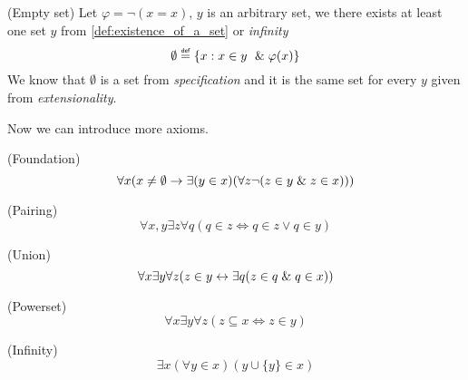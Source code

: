 \begin{definition}{(Empty set)}\label{def:emptyset}
Let $\varphi = \neg(x = x)$, $y$ is an arbitrary set, we there exists at least one set $y$ from \ref{def:existence_of_a_set} or \emph{infinity}
\begin{equation}
\emptyset \defeq \{x : x \in y\ \et \varphi(x)\}
\end{equation}
We know that $\emptyset$ is a set from \emph{specification} and it is the same set for every $y$ given from \emph{extensionality}.
\end{definition}

Now we can introduce more axioms.
\begin{definition}{(Foundation)}\label{def:foundation}
\begin{equation}
\forall x (x \neq \emptyset \rightarrow \exists (y \in x) (\forall z \neg (z \in y \mathrel{\&} z \in x)))
\end{equation}
\end{definition}

\begin{definition}{(Pairing)}\label{def:pairing}
\begin{equation}
\forall x, y \exists z \forall q (q \in z \iff q \in z \lor q \in y)
\end{equation}
\end{definition}

\begin{definition}{(Union)}\label{def:union}
\begin{equation}
\forall x \exists y \forall z (z \in y \leftrightarrow \exists q( z \in q \mathrel{\&} q \in x))
\end{equation}
\end{definition}

\begin{definition}{(Powerset)}\label{def:powerset}
\begin{equation}
\forall x \exists y \forall z (z \subseteq x \iff z \in y)
\end{equation}
\end{definition}

\begin{definition}{(Infinity)}\label{def:infinity}
\begin{equation}
\exists x (\forall y \in x)(y\cup\{y\} \in x)
\end{equation}
\end{definition}

